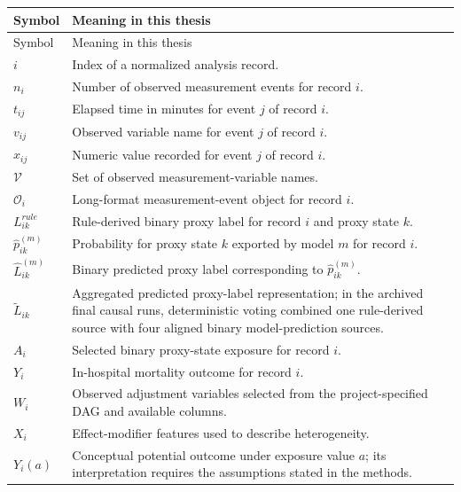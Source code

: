 \begin{longtable}{@{}L{0.25\textwidth}L{0.67\textwidth}@{}}
\toprule
Symbol & Meaning in this thesis \\
\midrule
\endfirsthead
\toprule
Symbol & Meaning in this thesis \\
\midrule
\endhead
\bottomrule
\endfoot
\(i\) & Index of a normalized analysis record. \\
\(n_i\) & Number of observed measurement events for record \(i\). \\
\(t_{ij}\) & Elapsed time in minutes for event \(j\) of record \(i\). \\
\(v_{ij}\) & Observed variable name for event \(j\) of record \(i\). \\
\(x_{ij}\) & Numeric value recorded for event \(j\) of record \(i\). \\
\(\mathcal{V}\) & Set of observed measurement-variable names. \\
\(\mathcal{O}_i\) & Long-format measurement-event object for record \(i\). \\
\(L^{rule}_{ik}\) & Rule-derived binary proxy label for record \(i\) and proxy state \(k\). \\
\(\hat p^{(m)}_{ik}\) & Probability for proxy state \(k\) exported by model \(m\) for record \(i\). \\
\(\hat L^{(m)}_{ik}\) & Binary predicted proxy label corresponding to \(\hat p^{(m)}_{ik}\). \\
\(\widetilde L_{ik}\) & Aggregated predicted proxy-label representation; in the archived final causal runs, deterministic voting combined one rule-derived source with four aligned binary model-prediction sources. \\
\(A_i\) & Selected binary proxy-state exposure for record \(i\). \\
\(Y_i\) & In-hospital mortality outcome for record \(i\). \\
\(W_i\) & Observed adjustment variables selected from the project-specified DAG and available columns. \\
\(X_i\) & Effect-modifier features used to describe heterogeneity. \\
\(Y_i(a)\) & Conceptual potential outcome under exposure value \(a\); its interpretation requires the assumptions stated in the methods. \\
\end{longtable}

